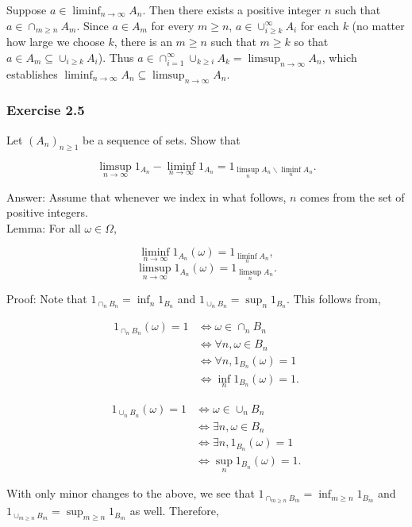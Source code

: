 \documentclass{article}
\begin{document}
Suppose $a \in \liminf_{n\rightarrow \infty} A_n$. Then there exists a positive integer $n$ such that $a \in \cap_{m\geq n} A_m$. Since $a \in A_m$ for every $m \geq n$, $a \in \cup_{i\geq k}^\infty A_i$ for each $k$ (no matter how large we choose $k$, there is an $m \geq n$ such that $m \geq k$ so that $a \in A_m \subseteq \cup_{i\geq k} A_i$). Thus $a \in \cap_{i=1}^\infty \cup_{k\geq i} A_k = \limsup_{n \rightarrow \infty} A_n$, which establishes $\liminf_{n\rightarrow \infty} A_n \subseteq \limsup_{n\rightarrow \infty} A_n$. 

\subsubsection*{Exercise 2.5} 

Let $(A_n)_{n \geq 1}$ be a sequence of sets. Show that

$$
\limsup_{n\rightarrow \infty} 1_{A_n} - \liminf_{n\rightarrow \infty} 1_{A_n}
= 1_{\limsup_n A_n \backslash \liminf_n A_n}.
$$

Answer: Assume that whenever we index in what follows, $n$ comes from the set of positive integers.\\

Lemma: For all $\omega \in \Omega$,

$$
\liminf_{n\rightarrow \infty} 1_{A_n}(\omega) = 1_{\liminf_n A_n},
$$
$$
\limsup_{n\rightarrow \infty} 1_{A_n}(\omega) = 1_{\limsup_n A_n}.
$$

Proof: Note that $1_{\cap_{n} B_n} = \inf_n 1_{B_n}$ and $1_{\cup_n B_n} = \sup_n 1_{B_n}$. This follows from,

\begin{align*}
1_{\cap_n B_n}(\omega) = 1 &\iff \omega \in \cap_n B_n \\
&\iff \forall n, \omega \in B_n \\
&\iff \forall n, 1_{B_n}(\omega) = 1 \\
&\iff \inf_n 1_{B_n}(\omega) = 1.
\end{align*}

\begin{align*}
1_{\cup_n B_n}(\omega) = 1 &\iff \omega \in \cup_n B_n \\
&\iff \exists n, \omega \in B_n \\
&\iff \exists n, 1_{B_n}(\omega) = 1 \\
&\iff \sup_n 1_{B_n}(\omega) = 1.
\end{align*}

With only minor changes to the above, we see that $1_{\cap_{m\geq n} B_m} = \inf_{m\geq n} 1_{B_m}$ and $1_{\cup_{m\geq n} B_m} = \sup_{m\geq n} 1_{B_m}$ as well. Therefore,
\end{document}
